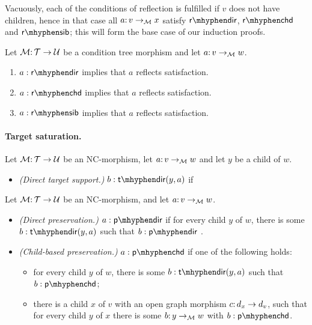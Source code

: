 Vacuously, each of the conditions of reflection is fulfilled if $v$ does not have children, hence in that case all $a{:}\, v\rightarrow_{\mathcal{M}} x$ satisfy $\rdir$, $\rchd$ and $\rsib$; this will form the base case of our induction proofs.

\begin{lemma}\label{lem:source-saturation}
Let ${\mathcal{M}}{:}\,{\mathcal{T}}\rightarrow{\mathcal{U}}$ be a condition tree morphism and let $a{:}\, v\rightarrow_{\mathcal{M}} w$.
\begin{enumerate}[topsep=\smallskipamount]
\item $a:\rdir$ implies that $a$ reflects satisfaction. 
\item $a:\rchd$ implies that $a$ reflects satisfaction. 
\item $a:\rsib$ implies that $a$ reflects satisfaction. 
\end{enumerate}
\end{lemma}

\paragraph{Target saturation.}

\begin{definition}\label{def:target support}
Let ${\mathcal{M}}{:}\, {\mathcal{T}}\rightarrow{\mathcal{U}}$ be an NC-morphism, let $a{:}\, v\rightarrow_{\mathcal{M}} w$ and let $y$ be a child of $w$.
\begin{itemize}[topsep=\smallskipamount]
\item \emph{(Direct target support.)} $b:\tdir(y,a)$ if 
\end{itemize}
\end{definition}

\begin{definition}
Let ${\mathcal{M}}{:}\, {\mathcal{T}}\rightarrow{\mathcal{U}}$ be an NC-morphism, and let $a{:}\, v\rightarrow_{\mathcal{M}} w$.
\begin{itemize}[topsep=\smallskipamount]
\item \emph{(Direct preservation.)} $a:\pdir$ if for every child $y$ of $w$, there is some $b:\tdir(y,a)$ such that $b:\pdir$ .
\item \emph{(Child-based preservation.)} $a:\pchd$ if one of the following holds:
\begin{itemize}
\item for every child $y$ of $w$, there is some $b:\tdir(y,a)$ such that $b:\pchd$;
\item there is a child $x$ of $v$ with an open graph morphism $c{:}\, d_x\rightarrow d_v$, such that for every child $y$ of $x$ there is some $b{:}\, y \rightarrow_{\mathcal{M}} w$ with $b:\pchd$.
\end{itemize}
\end{itemize}
\end{definition}

